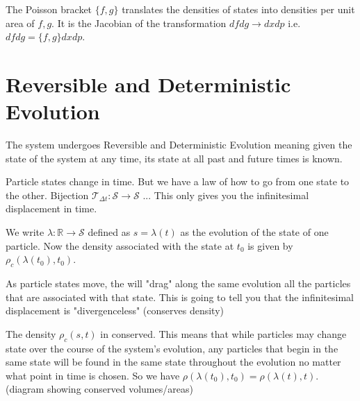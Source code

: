 \documentclass{article}
\begin{document}
\begin{prop}
	The Poisson bracket $\{f, g\}$ translates the densities of states into densities per unit area of $f, g$. It is the Jacobian of the transformation $dfdg \rightarrow dxdp$ i.e. $dfdg = \{f,g\}dxdp$.
\end{prop}
	
\section{Reversible and Deterministic Evolution}

\begin{assump}
	The system undergoes Reversible and Deterministic Evolution meaning given the state of the system at any time, its state at all past and future times is known.
\end{assump}

Particle states change in time. But we have a law of how to go from one state to the other. Bijection $\mathcal{T}_{\Delta t} : \mathcal{S} \to \mathcal{S}$ ... This only gives you the infinitesimal displacement in time.

\begin{defn}
	We write $\lambda: \mathbb{R} \rightarrow \mathcal{S}$ defined as $s = \lambda(t)$ as the evolution of the state of one particle. Now the density associated with the state at $t_0$ is given by $\rho_c(\lambda(t_0),t_0)$.
\end{defn}

	
As particle states move, the will "drag" along the same evolution all the particles that are associated with that state. This is going to tell you that the infinitesimal displacement is "divergenceless" (conserves density)

\begin{prop}
	The density $\rho_c(s,t)$ in conserved. This means that while particles may change state over the course of the system's evolution, any particles that begin in the same state will be found in the same state throughout the evolution no matter what point in time is chosen. So we have $\rho(\lambda(t_0),t_0) = \rho(\lambda(t),t)$. (diagram showing conserved volumes/areas)
\end{prop}
\end{document}
